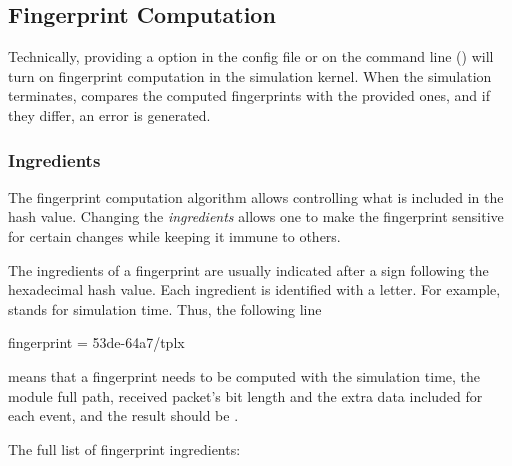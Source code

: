 \subsection{Fingerprint Computation}
\label{sec:testing:fingerprint-computation}

Technically, providing a  option in the config file or
on the command line () will turn on fingerprint
computation in the {\opp} simulation kernel. When the simulation terminates,
{\opp} compares the computed fingerprints with the provided ones, and
if they differ, an error is generated.

\subsubsection{Ingredients}
\label{sec:testing:fingerprint-ingredients}

The fingerprint computation algorithm allows controlling what is included
in the hash value. Changing the \textit{ingredients} allows one to make the
fingerprint sensitive for certain changes while keeping it immune to
others.

The ingredients of a fingerprint are usually indicated after a \ttt{/} sign
following the hexadecimal hash value. Each ingredient is identified with a
letter. For example,  stands for simulation time. Thus, the following
 line

\begin{inifile}
fingerprint = 53de-64a7/tplx
\end{inifile}

means that a fingerprint needs to be computed with the simulation time, the
module full path, received packet's bit length and the extra data included
for each event, and the result should be .

The full list of fingerprint ingredients:


